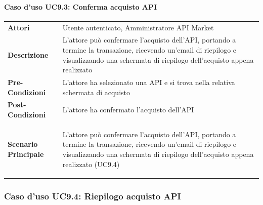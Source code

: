 \paragraph{Caso d'uso UC9.3: Conferma acquisto API}
\label{UC9_3}

\begin{minipage}{\linewidth}
	\begin{tabular}{ l | p{11cm}}
		\hline
		\rowcolor{Gray}
		\multicolumn{2}{c}{UC9.3 - Conferma acquisto API} \\
		\hline
		\textbf{Attori} & Utente autenticato, Amministratore API Market \\
		\textbf{Descrizione} & L'attore può confermare l'acquisto dell'API, portando a termine la transazione, ricevendo un'email di riepilogo e visualizzando una schermata di riepilogo dell'acquisto appena realizzato \\
		\textbf{Pre-Condizioni} & L'attore ha selezionato una API e si trova nella relativa schermata di acquisto \\
		\textbf{Post-Condizioni} & L'attore ha confermato l'acquisto dell'API \\
		\textbf{Scenario Principale} & 
		\begin{enumerate*}[label=(\arabic*.),itemjoin={\newline}]
			\item L'attore può confermare l'acquisto dell'API, portando a termine la transazione, ricevendo un'email di riepilogo e visualizzando una schermata di riepilogo dell'acquisto appena realizzato (UC9.4)
		\end{enumerate*}\\
	\end{tabular}
\end{minipage}

\subsubsection{Caso d'uso UC9.4: Riepilogo acquisto API}
\label{UC9_4}

